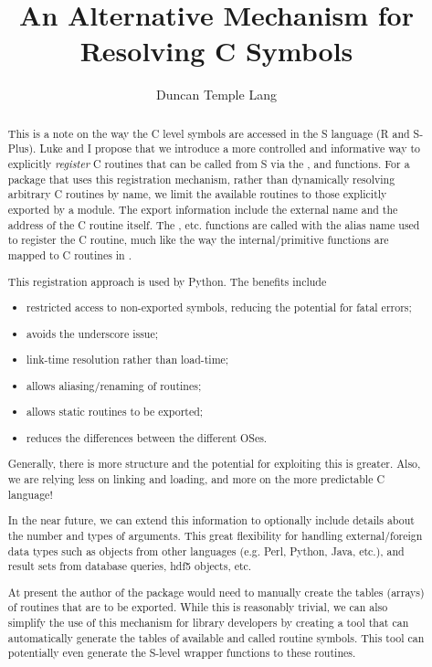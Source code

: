 \documentclass{article}
\author{Duncan Temple Lang}
\title{An Alternative Mechanism for Resolving C Symbols}
\begin{document}
\begin{abstract}

  This is a note on the way the C level symbols are accessed in the S
  language (R and S-Plus).  Luke and I propose that we introduce a
  more controlled and informative way to explicitly \textit{register}
  C routines that can be called from S via the ,
   and  functions.  For a package
  that uses this registration mechanism, rather than dynamically
  resolving arbitrary C routines by name, we limit the available
  routines to those explicitly exported by a module.  The export
  information include the external name and the address of the C
  routine itself.  The , etc. functions are called
  with the alias name used to register the C routine, much like
  the way the internal/primitive functions are mapped to C routines in
  .

  This registration approach is used by Python. The benefits
  include
  \begin{itemize}
   \item restricted access to non-exported symbols, reducing 
    the potential for fatal errors;
   \item avoids the underscore issue;
   \item link-time resolution rather than load-time;
   \item allows aliasing/renaming of routines;
   \item allows static routines to be exported;
   \item reduces the differences between the different OSes.
  \end{itemize}
  Generally, there is more structure and the potential for exploiting
  this is greater. Also, we are relying less on linking and loading,
  and more on the more predictable C language!

  In the near future, we can extend this information to optionally
  include details about the number and types of arguments.  This great
  flexibility for handling external/foreign data types such as objects
  from other languages (e.g. Perl, Python, Java, etc.), and result
  sets from database queries, hdf5 objects, etc.

  At present the author of the package would need to manually create
  the tables (arrays) of routines that are to be exported.  While this
  is reasonably trivial, we can also simplify the use of this
  mechanism for library developers by creating a tool that can
  automatically generate the tables of available and called routine
  symbols. This tool can potentially even generate the S-level wrapper
  functions to these routines.

\end{abstract}
\end{document}
